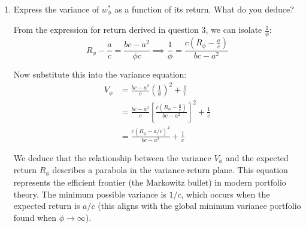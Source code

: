 \begin{enumerate}
            Now comparing the return $R_{\phi}$ to $a/c$:
            \[ R_{\phi} = \frac{bc - a^{2}}{\phi c} + \frac{a}{c} \]
            Since $bc - a^{2} > 0$, and we know $\phi > 0$ and $c > 0$ (because $\Sigma^{-1}$ is positive definite and $c = \mathbf{1}^{T}\Sigma^{-1}\mathbf{1}$), the term $\frac{bc - a^{2}}{\phi c}$ is strictly positive.
            Therefore, $R_{\phi} > \frac{a}{c}$.

      \item Express the variance of $w_{\phi}^{*}$ as a function of its return. What do you deduce?

            From the expression for return derived in question 3, we can isolate $\frac{1}{\phi}$:
            \[ R_{\phi} - \frac{a}{c} = \frac{bc - a^{2}}{\phi c} \implies \frac{1}{\phi} = \frac{c\left(R_{\phi} - \frac{a}{c}\right)}{bc - a^{2}} \]

            Now substitute this into the variance equation:
            \begin{align*}
                  V_{\phi} & = \frac{bc - a^{2}}{c} \left( \frac{1}{\phi} \right)^{2} + \frac{1}{c}                                          \\
                           & = \frac{bc - a^{2}}{c} \left[ \frac{c\left(R_{\phi} - \frac{a}{c}\right)}{bc - a^{2}} \right]^{2} + \frac{1}{c} \\
                           & = \frac{c(R_{\phi} - a/c)^{2}}{bc - a^{2}} + \frac{1}{c}
            \end{align*}

            We deduce that the relationship between the variance $V_{\phi}$ and the expected return $R_{\phi}$ describes a parabola in the variance-return plane. This equation represents the efficient frontier (the Markowitz bullet) in modern portfolio theory. The minimum possible variance is $1/c$, which occurs when the expected return is $a/c$ (this aligns with the global minimum variance portfolio found when $\phi \rightarrow \infty$).

\end{enumerate}